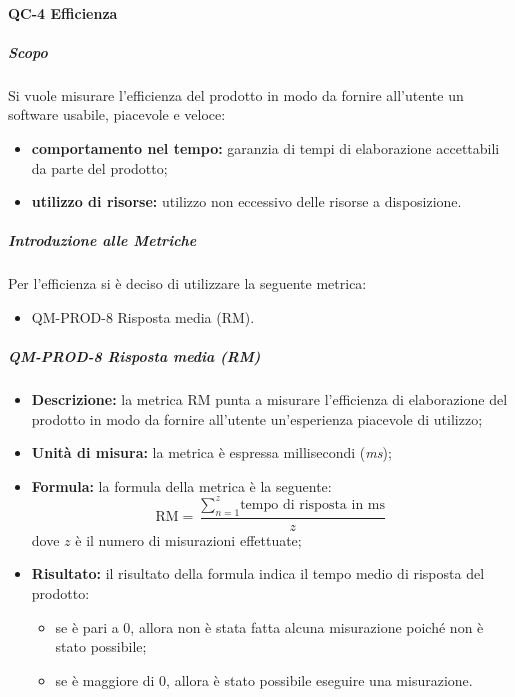 		\paragraph{QC-4 Efficienza}
			\subparagraph{Scopo}
				Si vuole misurare l'efficienza del prodotto in modo da fornire all'utente un software usabile, piacevole e veloce:
				\begin{itemize}
					\item \textbf{comportamento nel tempo:} garanzia di tempi di elaborazione accettabili da parte del prodotto;
					\item \textbf{utilizzo di risorse:} utilizzo non eccessivo delle risorse a disposizione.
				\end{itemize}
			\subparagraph{Introduzione alle Metriche}
				Per l'efficienza si è deciso di utilizzare la seguente metrica:
				\begin{itemize}
					\item QM-PROD-8 Risposta media (RM).
				\end{itemize}
			\subparagraph{QM-PROD-8 Risposta media (RM)}
			\begin{itemize}
      			\item \textbf{Descrizione: }
					la metrica RM punta a misurare l'efficienza di elaborazione del prodotto in modo da fornire all'utente un'esperienza piacevole di utilizzo;
				\item \textbf{Unità di misura: }
					la metrica è espressa millisecondi (\textit{ms});
				\item \textbf{Formula: }
					la formula della metrica è la seguente:
					\[
						\text{RM} = \frac{\sum_{n=1}^{z} \text{tempo di risposta in ms}}{z}
					\]
					dove $z$ è il numero di misurazioni effettuate;
				\item \textbf{Risultato: }
					il risultato della formula indica il tempo medio di risposta del prodotto:
					\begin{itemize}
						\item se è pari a 0, allora non è stata fatta alcuna misurazione poiché non è stato possibile;
						\item se è maggiore di 0, allora è stato possibile eseguire una misurazione.
					\end{itemize}
			\end{itemize}


